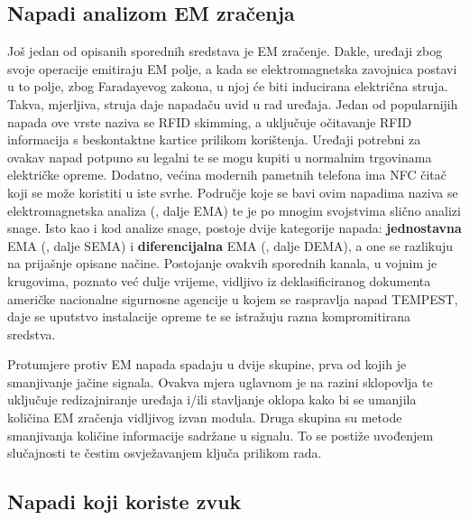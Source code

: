 \documentclass[times, utf8, diplomski]{fer}
\begin{document}
\subsection{Napadi analizom EM zračenja}
Još jedan od opisanih sporednih sredstava je EM zračenje. Dakle, uređaji zbog svoje operacije emitiraju EM polje, a kada se elektromagnetska zavojnica postavi u to polje, zbog Faradayevog zakona, u njoj će biti inducirana električna struja. Takva, mjerljiva, struja daje napadaču uvid u rad uređaja. Jedan od popularnijih napada ove vrste naziva se RFID skimming, a uključuje očitavanje RFID informacija s beskontaktne kartice prilikom korištenja. Uređaji potrebni za ovakav napad potpuno su legalni te se mogu kupiti u normalnim trgovinama električke opreme. Dodatno, većina modernih pametnih telefona ima NFC čitač koji se može koristiti u iste svrhe. Područje koje se bavi ovim napadima naziva se elektromagnetska analiza (, dalje EMA) te je po mnogim svojstvima slično analizi snage. Isto kao i kod analize snage, postoje dvije kategorije napada: \textbf{jednostavna} EMA (, dalje SEMA) i \textbf{diferencijalna} EMA (, dalje DEMA), a one se razlikuju na prijašnje opisane načine. Postojanje ovakvih sporednih kanala, u vojnim je krugovima, poznato već dulje vrijeme, vidljivo iz deklasificiranog dokumenta \citep{mcconnell1992national} američke nacionalne sigurnosne agencije  u kojem se raspravlja napad TEMPEST, daje se uputstvo instalacije opreme te se istražuju razna kompromitirana sredstva.

Protumjere protiv EM napada spadaju u dvije skupine, prva od kojih je smanjivanje jačine signala. Ovakva mjera uglavnom je na razini sklopovlja te uključuje redizajniranje uređaja i/ili stavljanje oklopa kako bi se umanjila količina EM zračenja vidljivog izvan modula. Druga skupina su metode smanjivanja količine informacije sadržane u signalu. To se postiže uvođenjem slučajnosti te čestim osvježavanjem ključa prilikom rada.

\subsection{Napadi koji koriste zvuk}
\end{document}
